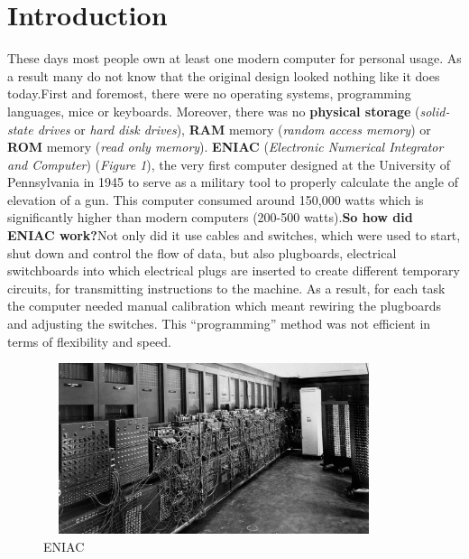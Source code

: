 \documentclass[12pt]{article}
\begin{document}
\newpage
\section{Introduction}
These days most people own at least one modern computer for personal usage. As a result many do not know that the original design looked nothing like it does today.\newline\newline First and foremost, there were no operating systems, programming languages, mice or keyboards. Moreover, there was no \textbf{physical storage} (\textit{solid-state drives} or \textit{hard disk drives}), \textbf{RAM} memory (\textit{random access memory}) or \textbf{ROM} memory (\textit{read only memory}). \textbf{ENIAC} (\textit{Electronic Numerical Integrator and Computer}) (\textit{Figure 1}), the very first computer designed at the University of Pennsylvania in 1945 to serve as a military tool to properly calculate the angle of elevation of a gun. This computer consumed around 150,000 watts which is significantly higher than modern computers (200-500 watts).\newline\newline \textbf{So how did ENIAC work?}\newline\newline Not only did it use cables and switches, which were used to start, shut down and control the flow of data, but also plugboards, electrical switchboards into which electrical plugs are inserted to create different temporary circuits, for transmitting instructions to the machine. As a result, for each task the computer needed manual calibration which meant rewiring the plugboards and adjusting the switches. This “programming” method was not efficient in terms of flexibility and speed.

\begin{figure}[H]
    \centering
    \includegraphics[width=10cm, height=5cm]{images/ENIAC.png}
    \caption{ENIAC}
\end{figure}
\end{document}
